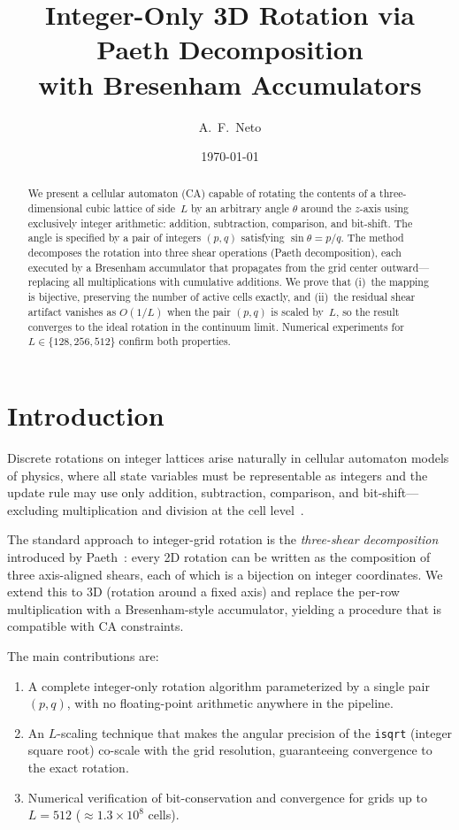 \documentclass[12pt,a4paper]{article}
\title{Integer-Only 3D Rotation via Paeth Decomposition\\with Bresenham Accumulators}
\author{A.~F.~Neto}
\date{\today}
\begin{document}
\maketitle

\begin{abstract}
We present a cellular automaton (CA) capable of rotating the contents
of a three-dimensional cubic lattice of side~$L$ by an arbitrary angle
$\theta$ around the $z$-axis using exclusively integer arithmetic:
addition, subtraction, comparison, and bit-shift.  The angle is
specified by a pair of integers $(p,q)$ satisfying
$\sin\theta = p/q$.  The method decomposes the rotation into three
shear operations (Paeth decomposition), each executed by a Bresenham
accumulator that propagates from the grid center outward---replacing
all multiplications with cumulative additions.  We prove that (i)~the
mapping is bijective, preserving the number of active cells exactly,
and (ii)~the residual shear artifact vanishes as $O(1/L)$ when the
pair $(p,q)$ is scaled by~$L$, so the result converges to the ideal
rotation in the continuum limit.  Numerical experiments for
$L\in\{128,256,512\}$ confirm both properties.
\end{abstract}

\section{Introduction}
\label{sec:intro}

Discrete rotations on integer lattices arise naturally in cellular
automaton models of physics, where all state variables must be
representable as integers and the update rule may use only
addition, subtraction, comparison, and bit-shift---excluding
multiplication and division at the cell level~\cite{toffoli1987}.

The standard approach to integer-grid rotation is the
\emph{three-shear decomposition} introduced by
Paeth~\cite{paeth1986}: every 2D rotation can be written as the
composition of three axis-aligned shears, each of which is a
bijection on integer coordinates.  We extend this to 3D (rotation
around a fixed axis) and replace the per-row multiplication with a
Bresenham-style accumulator, yielding a procedure that is
compatible with CA constraints.

The main contributions are:
\begin{enumerate}
\item A complete integer-only rotation algorithm parameterized by
      a single pair $(p,q)$, with no floating-point arithmetic
      anywhere in the pipeline.
\item An $L$-scaling technique that makes the angular precision of
      the \texttt{isqrt} (integer square root) co-scale with the
      grid resolution, guaranteeing convergence to the exact
      rotation.
\item Numerical verification of bit-conservation and convergence
      for grids up to $L=512$ ($\approx1.3\times10^8$ cells).
\end{enumerate}
\end{document}
